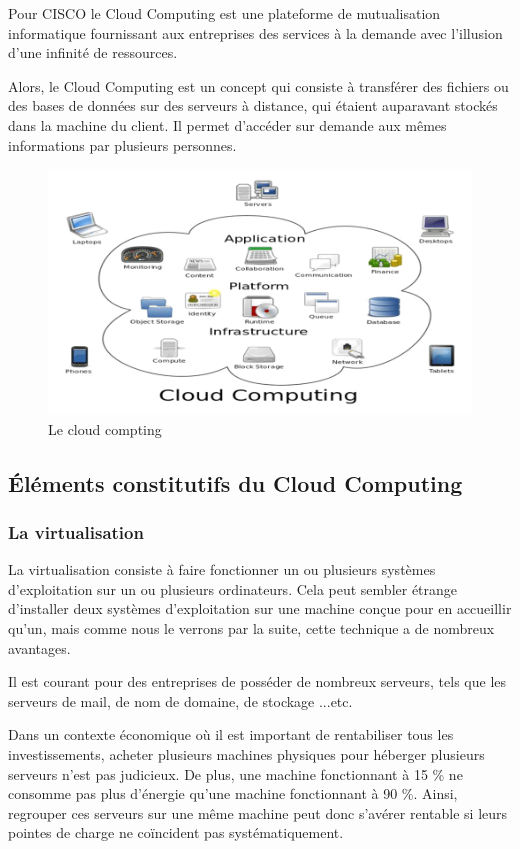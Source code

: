  
  	Pour CISCO le Cloud Computing est une plateforme de mutualisation informatique fournissant aux entreprises des services à la demande avec l’illusion d’une infinité de ressources. 
  	
  	Alors, le Cloud Computing est un concept qui consiste à transférer des fichiers ou des bases de données sur des serveurs à distance, qui étaient auparavant stockés dans la machine du client. Il permet d’accéder sur demande aux mêmes informations par plusieurs personnes.
  	\begin{figure}
  		\centering
  		\includegraphics[width=1\linewidth]{screenshot002}
  		\caption{Le cloud compting}
  		\label{fig:screenshot002}
  	\end{figure}
  	
  	
  	\subsection{Éléments constitutifs du Cloud Computing}
  	\subsubsection{La virtualisation}
  	La virtualisation consiste à faire fonctionner un ou plusieurs systèmes d'exploitation sur un ou plusieurs ordinateurs. Cela peut sembler étrange d'installer deux systèmes d'exploitation sur une machine conçue pour en accueillir qu'un, mais comme nous le verrons par la suite, cette technique a de nombreux avantages.
  	
  	Il est courant pour des entreprises de posséder de nombreux serveurs, tels que les serveurs de mail, de nom de domaine, de stockage ...etc.
  	
  	Dans un contexte économique où il est important de rentabiliser tous les investissements, acheter plusieurs machines physiques pour héberger plusieurs serveurs n'est pas judicieux. De plus, une machine fonctionnant à 15 \% ne consomme pas plus d'énergie qu'une machine fonctionnant à 90 \%. Ainsi, regrouper ces serveurs sur une même machine peut donc s'avérer rentable si leurs pointes de charge ne coïncident pas systématiquement.
  	
